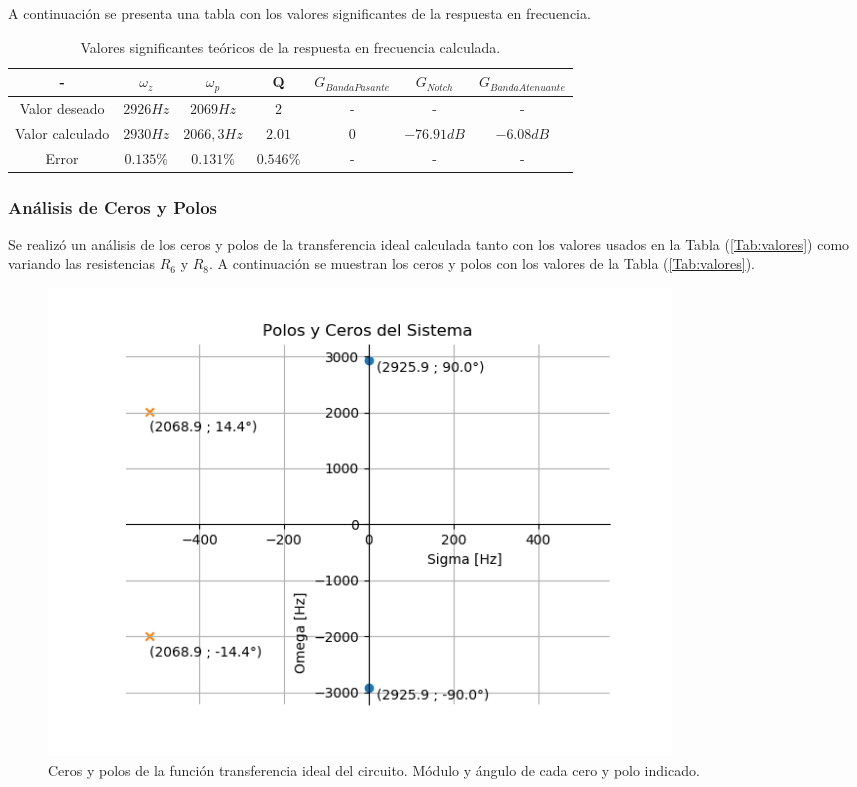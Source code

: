 A continuación se presenta una tabla con los valores significantes de la respuesta en frecuencia.

\begin{table}[H]
\centering
\begin{tabular}{@{}ccccccc@{}}
\toprule
- & $\omega_z$ & $\omega_p$ & Q & $G_{Banda Pasante}$  & $G_{Notch}$ & $G_{Banda Atenuante}$ \\ \midrule
Valor deseado & $2926Hz$ & $2069Hz$ & $2$ & - & - & - \\
Valor calculado & $2930Hz$ & $2066,3Hz$ & $2.01$ & $0$ & $-76.91dB$ & $-6.08dB$ \\ 
Error & $0.135\%$ & $0.131\%$ & $0.546\%$ & - & - & - \\ \bottomrule
\end{tabular}
\caption{Valores significantes teóricos de la respuesta en frecuencia calculada.}
\label{tab:rta_freq_calc}
\end{table}

\subsubsection{Análisis de Ceros y Polos}

Se realizó un análisis de los ceros y polos de la transferencia ideal calculada tanto con los valores usados en la Tabla (\ref{Tab:valores}) como variando las resistencias $R_6$ y $R_8$.
A continuación se muestran los ceros y polos con los valores de la Tabla (\ref{Tab:valores}).

\begin{figure} [H]
	\centering
	\includegraphics[width=0.8\textwidth]{Imagenes/cerosypolos_calc.PNG}
	\caption{Ceros y polos de la función transferencia ideal del circuito. Módulo y ángulo de cada cero y polo indicado.}
	\label{fig:cerosypolos_calc}
\end{figure}

